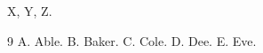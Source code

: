 \documentclass{article}
\begin{document}
X\cite{c,a,b}, Y\cite{b,a}, Z\cite{e,c,a,b}.
\begin{thebibliography}{9}
 A. Able.
 B. Baker.
 C. Cole.
 D. Dee.
 E. Eve.
\end{thebibliography}
\end{document}
